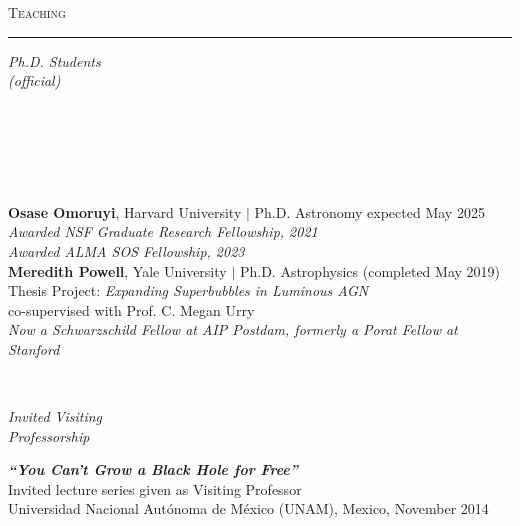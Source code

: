 \documentclass[11pt]{article}
\makeatletter
\def\vhrulefill#1{\leavevmode\leaders\hrule\@height#1\hfill \kern\z@}
\makeatother
\begin{document}
\clearpage



\textsc{Teaching} \vhrulefill{0.4pt}

\vspace{6mm}


\hspace{2.5mm} \parbox{1.5in}{\textit{Ph.D. Students \\ (official) \\\\\\\\\\\\}} \parbox{5.15in}{


\textbf{Osase Omoruyi}, Harvard University $|$ Ph.D. Astronomy expected May 2025\\
\textit{Awarded NSF Graduate Research Fellowship, 2021} \\
\textit{Awarded ALMA SOS Fellowship, 2023}
\\

\textbf{Meredith Powell}, Yale University $|$ Ph.D. Astrophysics (completed May 2019)\\ Thesis Project: \textit{Expanding Superbubbles in Luminous AGN}\\
co-supervised with Prof. C. Megan Urry\\
\textit{Now a Schwarzschild Fellow at AIP Postdam, formerly a Porat Fellow at Stanford}
}\\


\vspace{4mm}



\hspace{2.5mm} \parbox{1.5in}{\textit{Invited Visiting \\ Professorship \\ }} \parbox{5.15in}{ \textit{\textbf{``You Can't Grow a Black Hole for Free''}}\\ Invited lecture series given as Visiting Professor \\ Universidad Nacional Aut\'{o}noma de M\'{e}xico (UNAM), Mexico, November 2014}\\



\vspace{4mm}
\end{document}
